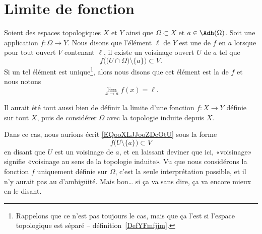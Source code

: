 \section{Limite de fonction}

\begin{definition}\label{DefYNVoWBx}
	Soient des espaces topologiques \( X\) et \( Y\) ainsi que \( \Omega\subset X\) et \( a\in \Adh(\Omega)\). Soit une application \( f\colon \Omega\to Y\). Nous disons que l'élément \( \ell\) de \( Y\) est une  de \( f\) en \( a\) lorsque pour tout ouvert \( V\) contenant \( \ell\), il existe un voisinage ouvert \( U\) de \( a\) tel que
	\begin{equation}        \label{EQooXLJJooZDcOtU}
		f\Big( \big( U\cap\Omega\big)\setminus\{ a \} \Big)\subset V.
	\end{equation}
	Si un tel élément est unique\footnote{Rappelons que ce n'est pas toujours le cas, mais que ça l'est si l'espace topologique est séparé -- définition~\ref{DefYFmfjjm}.}, alors nous disons que cet élément est la  de \( f\) et nous notons
	\begin{equation}
		\lim_{x\to a} f(x)=\ell.
	\end{equation}
\end{definition}

\begin{normaltext}
	Il aurait été tout aussi bien de définir la limite d'une fonction \( f\colon X\to Y\) définie sur tout \( X\), puis de considérer \( \Omega\) avec la topologie induite depuis \( X\).

	Dans ce cas, nous aurions écrit \eqref{EQooXLJJooZDcOtU} sous la forme
	\begin{equation}
		f\Big(  U\setminus\{ a \} \Big)\subset V
	\end{equation}
	en disant que \( U\) est un voisinage de \( a\), et en laissant  deviner que ici, «voisinage» signifie «voisinage au sens de la topologie induite». Vu que nous considérons la fonction \( f\) uniquement définie sur \( \Omega\), c'est la seule interprétation possible, et il n'y aurait pas au d'ambigüité\cite{BIBooMDAKooGEtFUd}. Mais bon\ldots{} si ça va sans dire, ça va encore mieux en le disant.
\end{normaltext}

